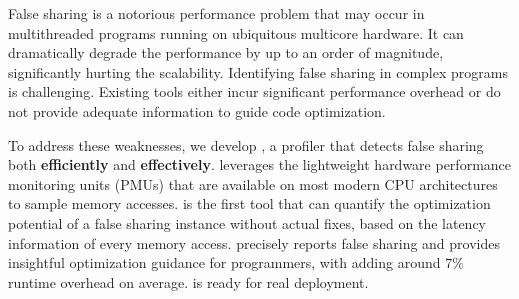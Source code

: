 
False sharing is a notorious performance problem that may occur in multithreaded programs running on ubiquitous multicore hardware. It can dramatically degrade the performance by up to an order of magnitude, significantly hurting the scalability. Identifying false sharing in complex programs is challenging. Existing tools either incur significant performance overhead or do not provide adequate information to guide code optimization.

\sloppy
To address these weaknesses, we develop \cheetah{}, a profiler that detects false sharing both {\bf efficiently} and {\bf effectively}. \cheetah{} leverages the lightweight hardware performance monitoring units (PMUs) that are available on most modern CPU architectures to sample memory accesses. \cheetah{} is the first tool that can quantify the optimization potential of a false sharing instance without actual fixes, based on the latency information of every memory access. \cheetah{} precisely reports false sharing and provides insightful optimization guidance for programmers, with adding around $7\%$ runtime overhead on average. \Cheetah{} is ready for real deployment. 

